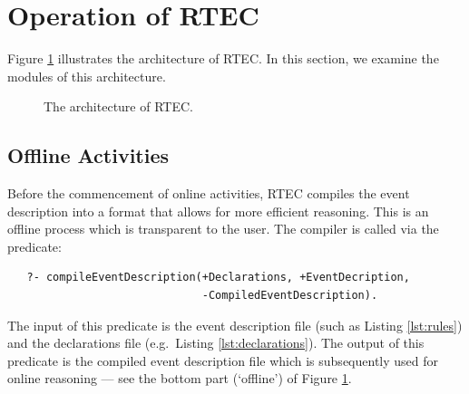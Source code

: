 \section{Operation of RTEC}\label{sec:architecture}

Figure \ref{fig:rtec-main} illustrates the architecture of RTEC. In this section, we examine the modules of this architecture.

\begin{figure}[t]
	\centering
	\caption{The architecture of RTEC.}
	\label{fig:rtec-main}
\end{figure}

\subsection{Offline Activities}\label{sec:compilation}

Before the commencement of online activities, RTEC compiles the event description into a format that allows for more efficient reasoning. This is an offline process which is transparent to the user. 
%
The compiler is called via the predicate: 

{\small
\begin{verbatim}
   ?- compileEventDescription(+Declarations, +EventDecription, 
                              -CompiledEventDescription).
\end{verbatim}
}

The input of this predicate is the event description file (such as Listing \ref{lst:rules}) and the declarations file (e.g.~Listing \ref{lst:declarations}). The output of this predicate is the compiled event description file which is subsequently used for online reasoning --- see the bottom part (`offline') of Figure \ref{fig:rtec-main}.

